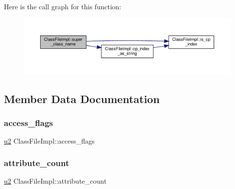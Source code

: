 Here is the call graph for this function\+:\nopagebreak
\begin{figure}[H]
\begin{center}
\leavevmode
\includegraphics[width=350pt]{classClassFileImpl_afd7229efcf341804086bcf6c00bb4820_cgraph}
\end{center}
\end{figure}


\subsection{Member Data Documentation}
\mbox{\label{classClassFileImpl_ae7bcc5b644d2164290c53a8727d36fb0}} 
\subsubsection{\texorpdfstring{access\+\_\+flags}{access\_flags}}
{\footnotesize\ttfamily \hyperlink{types_8h_ae676e9207f57fb921dca7366b2f59c53}{u2} Class\+File\+Impl\+::access\+\_\+flags}

\mbox{\label{classClassFileImpl_ac1085cebfdbb8a2469d9de9782d0576d}} 
\subsubsection{\texorpdfstring{attribute\+\_\+count}{attribute\_count}}
{\footnotesize\ttfamily \hyperlink{types_8h_ae676e9207f57fb921dca7366b2f59c53}{u2} Class\+File\+Impl\+::attribute\+\_\+count}

\mbox{\label{classClassFileImpl_a25689268cd6201a1b970a6dd41ac6fce}} 
